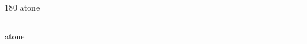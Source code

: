 
\begin{frame}
\begin{center}
\begin{turn}{180}
{\fontsize{2.5cm}{1em}\selectfont atone}
\end{turn}
\vspace{1em}\par  
\hrule
\vspace{1em}\par  
{\fontsize{2.5cm}{1em}\selectfont atone}
\end{center}
\end{frame}
